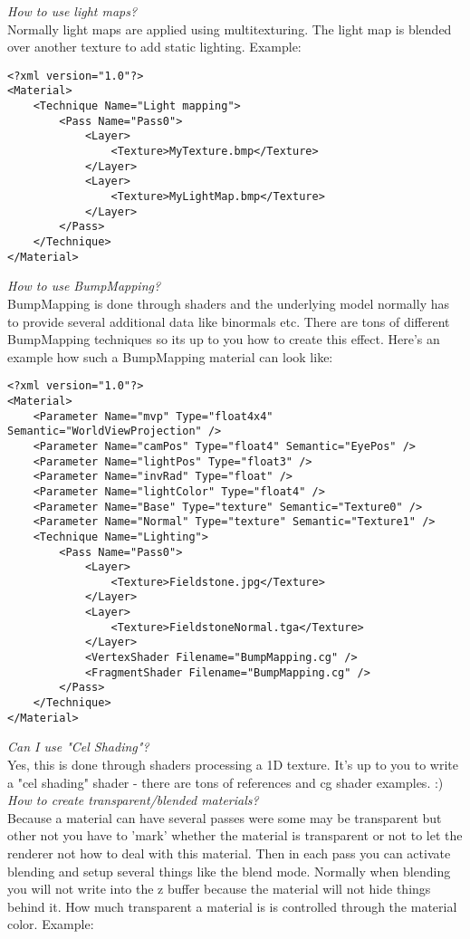 \emph{How to use light maps?}\\
Normally light maps are applied using multitexturing. The light map is blended over another
texture to add static lighting. Example:\\

\begin{lstlisting}[caption=Light mapping]
<?xml version="1.0"?>
<Material>
    <Technique Name="Light mapping">
        <Pass Name="Pass0">
            <Layer>
                <Texture>MyTexture.bmp</Texture>
            </Layer>
            <Layer>
                <Texture>MyLightMap.bmp</Texture>
            </Layer>
        </Pass>
    </Technique>
</Material>
\end{lstlisting}


\emph{How to use BumpMapping?}\\
BumpMapping is done through shaders and the underlying model normally has to provide several
additional data like binormals etc. There are tons of different BumpMapping techniques so its
up to you how to create this effect. Here's an example how such a BumpMapping material can look
like:\\

\begin{lstlisting}[caption=BumpMapping]
<?xml version="1.0"?>
<Material>
    <Parameter Name="mvp" Type="float4x4" Semantic="WorldViewProjection" />
    <Parameter Name="camPos" Type="float4" Semantic="EyePos" />
    <Parameter Name="lightPos" Type="float3" />
    <Parameter Name="invRad" Type="float" />
    <Parameter Name="lightColor" Type="float4" />
    <Parameter Name="Base" Type="texture" Semantic="Texture0" />
    <Parameter Name="Normal" Type="texture" Semantic="Texture1" />
    <Technique Name="Lighting">
        <Pass Name="Pass0">
            <Layer>
                <Texture>Fieldstone.jpg</Texture>
            </Layer>
            <Layer>
                <Texture>FieldstoneNormal.tga</Texture>
            </Layer>
            <VertexShader Filename="BumpMapping.cg" />
            <FragmentShader Filename="BumpMapping.cg" />
        </Pass>
    </Technique>
</Material>
\end{lstlisting}


\emph{Can I use "Cel Shading"?}\\
Yes, this is done through shaders processing a 1D texture. It's up to you to write a "cel shading"
shader - there are tons of references and cg shader examples. :)\\


\emph{How to create transparent/blended materials?}\\
Because a material can have several passes were some may be transparent but other not you have
to 'mark' whether the material is transparent or not to let the renderer not how to deal with
this material. Then in each pass you can activate blending and setup several things like the blend
mode. Normally when blending you will not write into the z buffer because the material will not
hide things behind it. How much transparent a material is is controlled through the material color.
Example:\\

